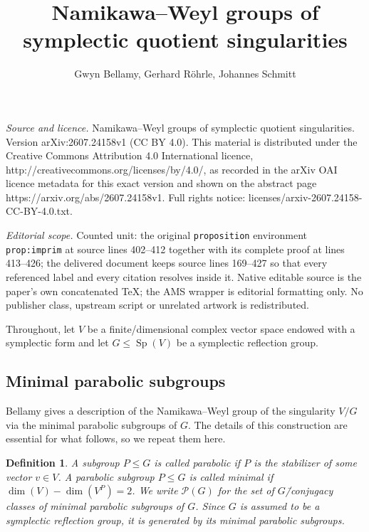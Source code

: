 \documentclass[10pt,a4paper]{amsart}
\newtheorem{definition}[theorem]{Definition}
\DeclareMathOperator{\Sp}{Sp}
\begin{document}
\title[Namikawa--Weyl groups of symplectic quotient singularities]{Namikawa--Weyl groups of symplectic quotient singularities}
\author{Gwyn Bellamy, Gerhard Röhrle, Johannes Schmitt}
\date{}
\maketitle
\noindent\emph{Source and licence.} Namikawa--Weyl groups of symplectic quotient singularities. Version arXiv:2607.24158v1 (CC BY 4.0). This material is distributed under the Creative Commons Attribution 4.0 International licence, http://creativecommons.org/licenses/by/4.0/, as recorded in the arXiv OAI licence metadata for this exact version and shown on the abstract page https://arxiv.org/abs/2607.24158v1. Full rights notice: licenses/arxiv-2607.24158-CC-BY-4.0.txt.\par\smallskip
\noindent\textit{Editorial scope.} Counted unit: the original \texttt{proposition} environment \texttt{prop:imprim} at source lines 402--412 together with its complete proof at lines 413--426; the delivered document keeps source lines 169--427 so that every referenced label and every citation resolves inside it. Native editable source is the paper's own concatenated TeX; the AMS wrapper is editorial formatting only. No publisher class, upstream script or unrelated artwork is redistributed.
\label{sec:namikawaweyl}

Throughout, let \(V\) be a finite\-/dimensional complex vector space endowed with a symplectic form and let \(G\leqslant \Sp(V)\) be a symplectic reflection group.

\subsection{Minimal parabolic subgroups}
Bellamy \cite{Bel16} gives a description of the Namikawa--Weyl group of the singularity \(V/G\) via the minimal parabolic subgroups of \(G\). The details of this construction are essential for what follows, so we repeat them here.

\begin{definition}
  A subgroup \(P \leqslant G\) is called \emph{parabolic} if \(P\) is the stabilizer of some vector \(v\in V\).
  A parabolic subgroup \(P\leqslant G\) is called \emph{minimal} if \(\dim(V) - \dim(V^P) = 2\).
  We write \(\mathcal P(G)\) for the set of \(G\)\=/conjugacy classes of minimal parabolic subgroups of \(G\). Since $G$ is assumed to be a symplectic reflection group, it is generated by its minimal parabolic subgroups. 
\end{definition}
\end{document}
